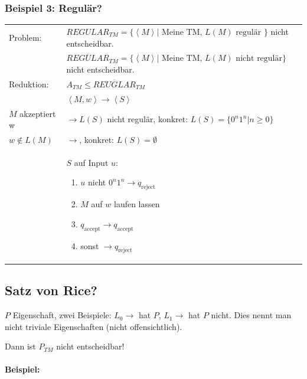 \subsubsection{Beispiel 3: Regulär?}


\begin{tabu}{l X}

Problem: &$REGULAR_{TM} = \{ \left<M\right> | \text{ Meine TM, } L(M) \text{ regulär }\}$ nicht entscheidbar. \\
& $\overline{REGULAR}_{TM} = \{\left<M\right> | \text{ Meine TM, } L(M) \text{ nicht regulär} \}$ nicht entscheidbar.	\\
Reduktion: & $A_{TM} \leq \overline{REUGLAR}_{TM}$ \\
	&$\left<M,w\right> \rightarrow \left<S\right>$ \\
	$M$ akzeptiert w &$\rightarrow L(S)$ nicht regulär, konkret: $L(S) = \{0^n1^n | n \geq 0 \}$ \\
$w \not\in L(M)$ &$\rightarrow$, konkret: $L(S) = \emptyset$ \\
& $S$ auf Input $u$: \begin{enumerate}
		\item $u$ nicht $0^n1^n \rightarrow q_\text{reject}$
		\item $M$ auf $w$ laufen lassen
		\item $q_\text{accept} \rightarrow q_\text{accept}$
		\item sonst $\rightarrow q_\text{reject}$
	\end{enumerate}
\end{tabu}

\subsection{Satz von Rice?}

$P$ Eigenschaft, zwei Beispiele: $L_0 \rightarrow$ hat $P$, $L_1 \rightarrow$ hat $P$ nicht. Dies nennt man nicht triviale Eigenschaften (nicht offensichtlich).

Dann ist $P_{TM}$ nicht entscheidbar!

\paragraph{Beispiel:}

